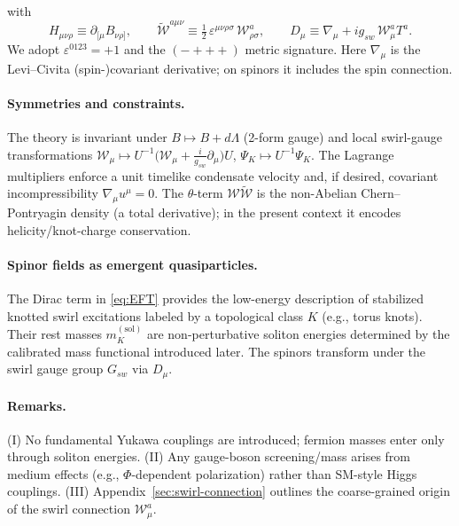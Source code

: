 \documentclass[smallextended]{svjour3}       %
\begin{document}
	with
	\[
		H_{\mu\nu\rho}\equiv \partial_{[\mu}B_{\nu\rho]},\qquad
		\tilde{\mathcal{W}}^{a\mu\nu}\equiv \tfrac{1}{2}\,\varepsilon^{\mu\nu\rho\sigma}\,\mathcal{W}^a_{\rho\sigma},\qquad
		D_\mu\equiv \nabla_\mu + i g_{\!sw}\,\mathcal{W}_\mu^a T^a .
	\]
	We adopt \(\varepsilon^{0123}=+1\) and the \((-+++)\) metric signature.
	Here \(\nabla_\mu\) is the Levi–Civita (spin-)covariant derivative; on spinors it includes the spin connection.

	\paragraph{Symmetries and constraints.}
	The theory is invariant under
	\(B\mapsto B+d\Lambda\) (2-form gauge) and local swirl-gauge transformations
	\(\mathcal{W}_\mu \mapsto U^{-1}\!\big(\mathcal{W}_\mu + \tfrac{i}{g_{\!sw}}\partial_\mu\big)U\),
	\(\Psi_K\mapsto U^{-1}\Psi_K\).
	The Lagrange multipliers enforce a unit timelike condensate velocity and, if desired, covariant incompressibility \(\nabla_\mu u^\mu=0\).
	The \(\theta\)-term \(\mathcal{W}\tilde{\mathcal{W}}\) is the non-Abelian Chern–Pontryagin density (a total derivative); in the present context it encodes helicity/knot-charge conservation.

	\paragraph{Spinor fields as emergent quasiparticles.}
	The Dirac term in \eqref{eq:EFT} provides the low-energy description of stabilized knotted swirl excitations labeled by a topological class \(K\) (e.g., torus knots). Their rest masses \(m_K^{(\mathrm{sol})}\) are non-perturbative soliton energies determined by the calibrated mass functional introduced later. The spinors transform under the swirl gauge group \(G_{\!sw}\) via \(D_\mu\).

	\paragraph{Remarks.}
	(I) No fundamental Yukawa couplings are introduced; fermion masses enter only through soliton energies.
	(II) Any gauge-boson screening/mass arises from medium effects (e.g., \(\Phi\)-dependent polarization) rather than SM-style Higgs couplings.
	(III) Appendix~\ref{sec:swirl-connection} outlines the coarse-grained origin of the swirl connection \(\mathcal{W}_\mu^a\).
\end{document}
